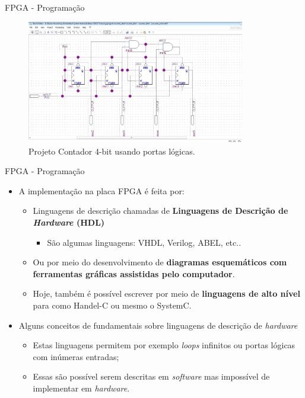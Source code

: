 \documentclass[aspectratio=169]{beamer}
\begin{document}
	\begin{frame}{FPGA - Programação}
		\begin{figure}[p]
			\centering
			\includegraphics[width=0.85\textwidth]{img/fpga/software_quartus_portas2.jpg}
			\caption{Projeto Contador 4-bit usando portas lógicas.}
			\label{fig:alteraquartus_portas2-2}
		\end{figure}
	\end{frame}
	
	\begin{frame}{FPGA - Programação}
		\begin{itemize}
			\setlength\itemsep{1.0em}
			\item A implementação na placa FPGA é feita por:
			\begin{itemize}
				\setlength\itemsep{0.5em}
				\item Linguagens de descrição chamadas de \textbf{Linguagens de Descrição de \textit{Hardware} (HDL)}
				\begin{itemize}
					\item São algumas linguagens: VHDL, Verilog, ABEL, etc..
				\end{itemize}
				
				\item Ou por meio do desenvolvimento de \textbf{diagramas esquemáticos com ferramentas gráficas assistidas pelo computador}.
				
				\item Hoje, também é possível escrever por meio de \textbf{linguagens de alto nível} para como Handel-C ou mesmo o SystemC.
			\end{itemize}
			
			\item Alguns conceitos de fundamentais sobre linguagens de descrição de \textit{hardware}
			\begin{itemize}
				\setlength\itemsep{0.5em}
				\item Estas linguagens permitem por exemplo \textit{loops} infinitos ou portas lógicas com inúmeras entradas;
				
				\item Essas são possível serem descritas em \textit{software} mas impossível de implementar em \textit{hardware}.
			\end{itemize}
		\end{itemize}
	\end{frame}
	
\end{document}
